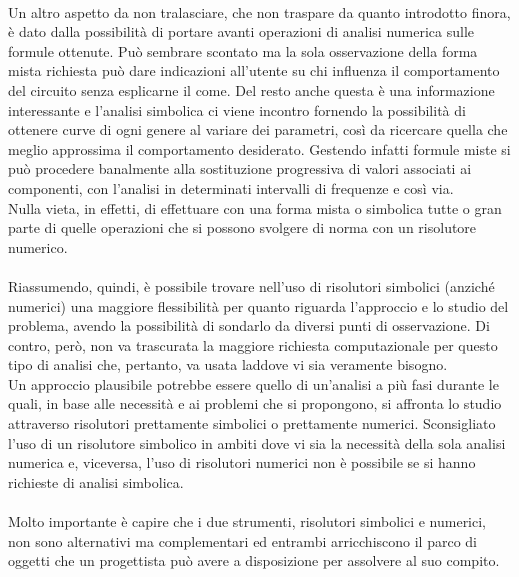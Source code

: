 \paragraph{}
Un altro aspetto da non tralasciare, che non traspare da quanto introdotto finora, è dato dalla possibilità di portare avanti operazioni di analisi numerica sulle formule ottenute. Può sembrare scontato ma la sola osservazione della forma mista richiesta può dare indicazioni all'utente su chi influenza il comportamento del circuito senza esplicarne il come. Del resto anche questa è una informazione interessante e l'analisi simbolica ci viene incontro fornendo la possibilità di ottenere curve di ogni genere al variare dei parametri, così da ricercare quella che meglio approssima il comportamento desiderato. Gestendo infatti formule miste si può procedere banalmente alla sostituzione progressiva di valori associati ai componenti, con l'analisi in determinati intervalli di frequenze e così via.\\
Nulla vieta, in effetti, di effettuare con una forma mista o simbolica tutte o gran parte di quelle operazioni che si possono svolgere di norma con un risolutore numerico.

\paragraph{}
Riassumendo, quindi, è possibile trovare nell'uso di risolutori simbolici (anziché numerici) una maggiore flessibilità per quanto riguarda l'approccio e lo studio del problema, avendo la possibilità di sondarlo da diversi punti di osservazione. Di contro, però, non va trascurata la maggiore richiesta computazionale per questo tipo di analisi che, pertanto, va usata laddove vi sia veramente bisogno.\\
Un approccio plausibile potrebbe essere quello di un'analisi a più fasi durante le quali, in base alle necessità e ai problemi che si propongono, si affronta lo studio attraverso risolutori prettamente simbolici o prettamente numerici. Sconsigliato l'uso di un risolutore simbolico in ambiti dove vi sia la necessità della sola analisi numerica e, viceversa, l'uso di risolutori numerici non è possibile se si hanno richieste di analisi simbolica.

\paragraph{}
Molto importante è capire che i due strumenti, risolutori simbolici e numerici, non sono alternativi ma complementari ed entrambi arricchiscono il parco di oggetti che un progettista può avere a disposizione per assolvere al suo compito.


